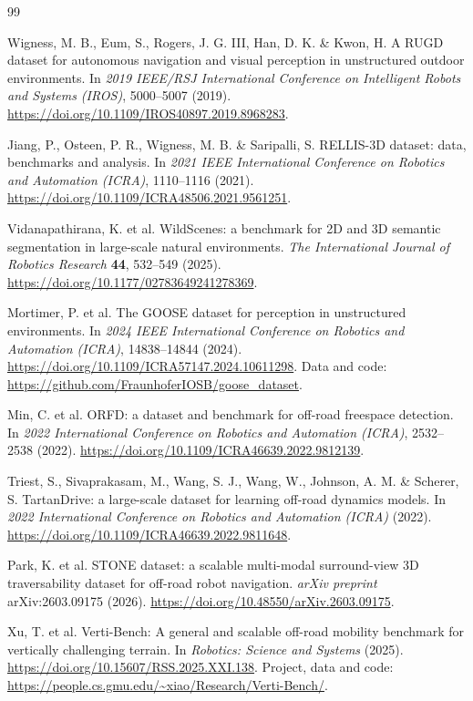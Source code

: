 \documentclass[11pt]{article}
\begin{document}
\begin{thebibliography}{99}

Wigness, M. B., Eum, S., Rogers, J. G. III, Han, D. K. \& Kwon, H. A RUGD
dataset for autonomous navigation and visual perception in unstructured outdoor
environments. In \textit{2019 IEEE/RSJ International Conference on Intelligent
Robots and Systems (IROS)}, 5000--5007 (2019).
\url{https://doi.org/10.1109/IROS40897.2019.8968283}.

Jiang, P., Osteen, P. R., Wigness, M. B. \& Saripalli, S. RELLIS-3D dataset:
data, benchmarks and analysis. In \textit{2021 IEEE International Conference on
Robotics and Automation (ICRA)}, 1110--1116 (2021).
\url{https://doi.org/10.1109/ICRA48506.2021.9561251}.

Vidanapathirana, K. et al. WildScenes: a benchmark for 2D and 3D semantic
segmentation in large-scale natural environments. \textit{The International
Journal of Robotics Research} \textbf{44}, 532--549 (2025).
\url{https://doi.org/10.1177/02783649241278369}.

Mortimer, P. et al. The GOOSE dataset for perception in unstructured
environments. In \textit{2024 IEEE International Conference on Robotics and
Automation (ICRA)}, 14838--14844 (2024).
\url{https://doi.org/10.1109/ICRA57147.2024.10611298}.
Data and code: \url{https://github.com/FraunhoferIOSB/goose_dataset}.

Min, C. et al. ORFD: a dataset and benchmark for off-road freespace detection.
In \textit{2022 International Conference on Robotics and Automation (ICRA)},
2532--2538 (2022).
\url{https://doi.org/10.1109/ICRA46639.2022.9812139}.

Triest, S., Sivaprakasam, M., Wang, S. J., Wang, W., Johnson, A. M. \& Scherer,
S. TartanDrive: a large-scale dataset for learning off-road dynamics models. In
\textit{2022 International Conference on Robotics and Automation (ICRA)}
(2022). \url{https://doi.org/10.1109/ICRA46639.2022.9811648}.

Park, K. et al. STONE dataset: a scalable multi-modal surround-view 3D
traversability dataset for off-road robot navigation. \textit{arXiv preprint}
arXiv:2603.09175 (2026).
\url{https://doi.org/10.48550/arXiv.2603.09175}.

Xu, T. et al. Verti-Bench: A general and scalable off-road mobility benchmark
for vertically challenging terrain. In \textit{Robotics: Science and Systems}
(2025). \url{https://doi.org/10.15607/RSS.2025.XXI.138}.
Project, data and code: \url{https://people.cs.gmu.edu/~xiao/Research/Verti-Bench/}.


\end{thebibliography}
\end{document}
